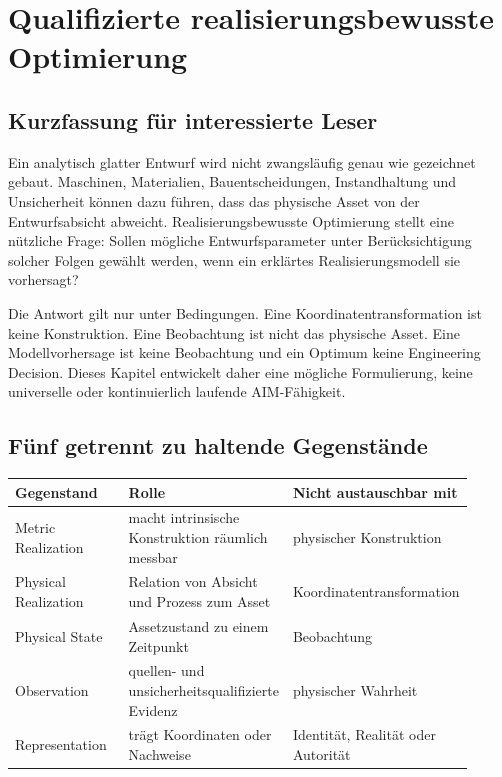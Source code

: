 \chapter{Qualifizierte realisierungsbewusste Optimierung}

\section*{Kurzfassung für interessierte Leser}

Ein analytisch glatter Entwurf wird nicht zwangsläufig genau wie gezeichnet
gebaut. Maschinen, Materialien, Bauentscheidungen, Instandhaltung und
Unsicherheit können dazu führen, dass das physische Asset von der
Entwurfsabsicht abweicht. Realisierungsbewusste Optimierung stellt eine
nützliche Frage: Sollen mögliche Entwurfsparameter unter Berücksichtigung
solcher Folgen gewählt werden, wenn ein erklärtes Realisierungsmodell sie
vorhersagt?

Die Antwort gilt nur unter Bedingungen. Eine Koordinatentransformation ist
keine Konstruktion. Eine Beobachtung ist nicht das physische Asset. Eine
Modellvorhersage ist keine Beobachtung und ein Optimum keine Engineering
Decision. Dieses Kapitel entwickelt daher eine mögliche Formulierung, keine
universelle oder kontinuierlich laufende AIM-Fähigkeit.

\section{Fünf getrennt zu haltende Gegenstände}

\begin{center}
\small
\begin{tabular}{p{0.25\linewidth}p{0.31\linewidth}p{0.35\linewidth}}
\toprule
Gegenstand & Rolle & Nicht austauschbar mit\\
\midrule
Metric Realization & macht intrinsische Konstruktion räumlich messbar & physischer Konstruktion\\
Physical Realization & Relation von Absicht und Prozess zum Asset & Koordinatentransformation\\
Physical State & Assetzustand zu einem Zeitpunkt & Beobachtung\\
Observation & quellen- und unsicherheitsqualifizierte Evidenz & physischer Wahrheit\\
Representation & trägt Koordinaten oder Nachweise & Identität, Realität oder Autorität\\
\bottomrule
\end{tabular}
\end{center}

